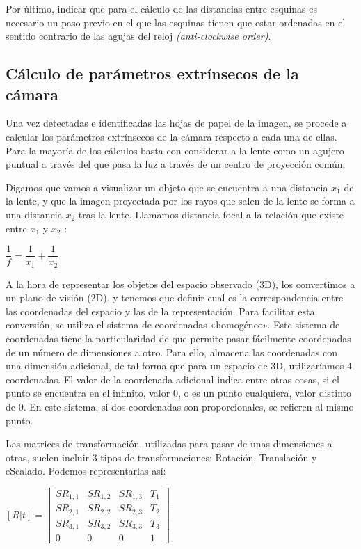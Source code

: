 Por último, indicar que para el cálculo de las distancias entre esquinas es necesario un paso previo en el que las esquinas tienen que estar ordenadas en el sentido contrario de las agujas del reloj  \textit{(anti-clockwise order)}.

\subsection{Cálculo de parámetros extrínsecos de la cámara}
Una vez detectadas e identificadas las hojas de papel de la imagen, se procede a calcular los parámetros extrínsecos de la cámara respecto a cada una de ellas. Para la mayoría de los cálculos basta con considerar a la lente como un agujero puntual a través del que pasa la luz a través de un centro de proyección común. 

Digamos que vamos a visualizar un objeto que se encuentra a una distancia $x_{1}$ de la lente, y que la imagen proyectada por los rayos que salen de la lente se forma a una distancia $x_{2}$ tras la lente. Llamamos distancia focal a la relación que existe entre $x_{1}$ y $x_{2}$ :
\begin{center}
$\dfrac{1}{f} = \dfrac{1}{x_{1}} + \dfrac{1}{x_{2}}$
\end{center}

A la hora de representar los objetos del espacio observado (3D), los convertimos a un plano de visión (2D), y tenemos que definir cual es la correspondencia entre las coordenadas del espacio y las de la representación. Para facilitar esta conversión, se utiliza el sistema de coordenadas «homogéneo». Este sistema de coordenadas tiene la particularidad de que permite pasar fácilmente coordenadas de un número de dimensiones a otro. Para ello, almacena las coordenadas con una dimensión adicional, de tal forma que para un espacio de 3D, utilizaríamos 4 coordenadas. El valor de la coordenada adicional indica entre otras cosas, si el punto se encuentra en el infinito, valor 0, o es un punto cualquiera, valor distinto de 0. En este sistema, si dos coordenadas son proporcionales, se refieren al mismo punto.

Las matrices de transformación, utilizadas para pasar de unas dimensiones a otras, suelen incluir 3 tipos de transformaciones: Rotación, Translación y eScalado. Podemos representarlas así:
\begin{center}
$[R|t] = \begin{bmatrix} SR_{1,1} & SR_{1,2} & SR_{1,3} & T_{1}  \\
                                 SR_{2,1} & SR_{2,2} & SR_{2,3} & T_{2}  \\
                                 SR_{3,1} & SR_{3,2} & SR_{3,3} & T_{3}  \\
                                     0    &     0    &     0    &  1 
                  \end{bmatrix}
$
\end{center}

